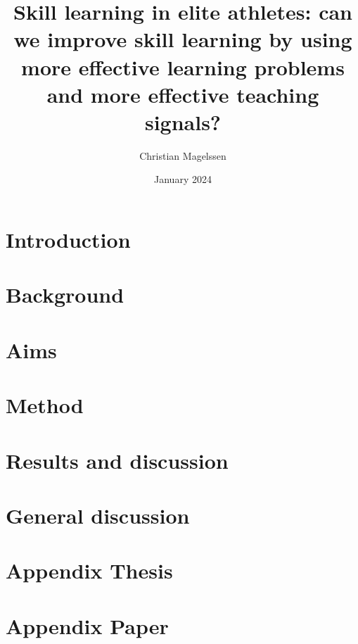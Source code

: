 \documentclass{report}
\title{Skill learning in elite athletes: can we improve skill learning by using more effective learning problems and more effective teaching signals?}
\author{Christian Magelssen}
\date{January 2024}
\begin{document}
\newcommand{\RNum}[1]{\uppercase\expandafter{\romannumeral #1\relax}}


\maketitle

\tableofcontents 
\listoffigures




\chapter{Introduction}


\chapter{Background}


\chapter{Aims}



\chapter{Method}



\chapter{Results and discussion}


\chapter{General discussion}


\chapter{Appendix Thesis}



\chapter{Appendix Paper \RNum{1}}





\printbibliography
\end{document}
